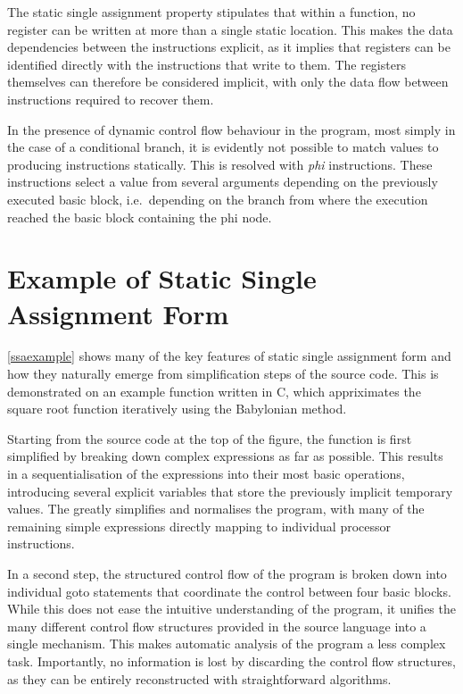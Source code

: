     The static single assignment property stipulates that within a function,
    no register can be written at more than a single static location.
    This makes the data dependencies between the instructions explicit, as it
    implies that registers can be identified directly with the instructions that
    write to them.
    The registers themselves can therefore be considered implicit, with only the
    data flow between instructions required to recover them.

    In the presence of dynamic control flow behaviour in the program, most
    simply in the case of a conditional branch, it is evidently not possible to
    match values to producing instructions statically.
    This is resolved with {\em phi} instructions.
    These instructions select a value from several arguments depending on the
    previously executed basic block, i.e.\ depending on the branch from where
    the execution reached the basic block containing the phi node.

\section{Example of Static Single Assignment Form}

    \autoref{ssaexample} shows many of the key features of static single
    assignment form and how they naturally emerge from simplification steps of
    the source code.
    This is demonstrated on an example function written in C, which appriximates
    the square root function iteratively using the Babylonian method.
    

    Starting from the source code at the top of the figure, the function is
    first simplified by breaking down complex expressions as far as possible.
    This results in a sequentialisation of the expressions into their most basic
    operations, introducing several explicit variables that store the previously
    implicit temporary values.
    The greatly simplifies and normalises the program, with many of the
    remaining simple expressions directly mapping to individual processor
    instructions.

    In a second step, the structured control flow of the program is broken down
    into individual goto statements that coordinate the control between four
    basic blocks.
    While this does not ease the intuitive understanding of the program, it
    unifies the many different control flow structures provided in the source
    language into a single mechanism.
    This makes automatic analysis of the program a less complex task.
    Importantly, no information is lost by discarding the control flow
    structures, as they can be entirely reconstructed with straightforward
    algorithms.

